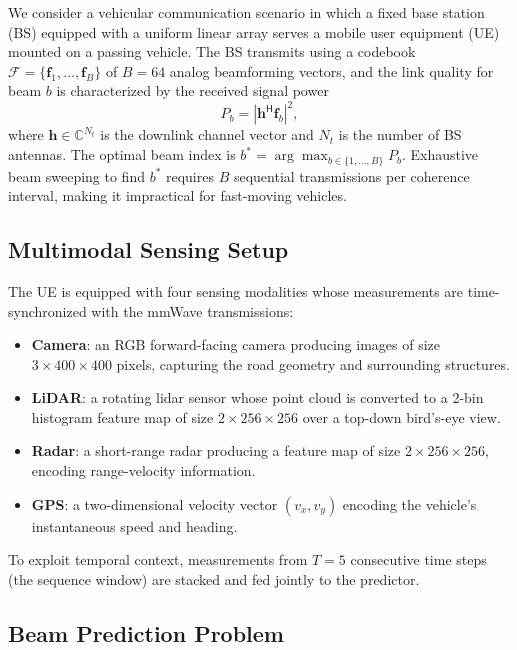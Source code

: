 \documentclass[journal,10pt,twoside]{IEEEtran}
\begin{document}
We consider a vehicular communication scenario in which a fixed base station
(BS) equipped with a uniform linear array serves a mobile user equipment (UE)
mounted on a passing vehicle. The BS transmits using a codebook
$\mathcal{F} = \{\mathbf{f}_1, \ldots, \mathbf{f}_B\}$ of $B=64$ analog
beamforming vectors, and the link quality for beam $b$ is characterized by
the received signal power
\begin{equation}
  P_b = \left|\mathbf{h}^{\mathsf{H}} \mathbf{f}_b\right|^2,
  \label{eq:received_power}
\end{equation}
where $\mathbf{h} \in \mathbb{C}^{N_t}$ is the downlink channel vector and
$N_t$ is the number of BS antennas. The optimal beam index is
$b^* = \arg\max_{b \in \{1,\ldots,B\}} P_b$.
Exhaustive beam sweeping to find $b^*$ requires $B$ sequential transmissions
per coherence interval, making it impractical for fast-moving vehicles.

\subsection{Multimodal Sensing Setup}

The UE is equipped with four sensing modalities whose measurements are
time-synchronized with the mmWave transmissions:

\begin{itemize}
  \item \textbf{Camera}: an RGB forward-facing camera producing images of size
    $3\times 400 \times 400$ pixels, capturing the road geometry and
    surrounding structures.
  \item \textbf{LiDAR}: a rotating lidar sensor whose point cloud is
    converted to a 2-bin histogram feature map of size $2\times 256 \times 256$
    over a top-down bird's-eye view.
  \item \textbf{Radar}: a short-range radar producing a feature map of size
    $2\times 256 \times 256$, encoding range-velocity information.
  \item \textbf{GPS}: a two-dimensional velocity vector $(v_x, v_y)$ encoding
    the vehicle's instantaneous speed and heading.
\end{itemize}

To exploit temporal context, measurements from $T = 5$ consecutive time steps
(the sequence window) are stacked and fed jointly to the predictor.

\subsection{Beam Prediction Problem}
\end{document}

